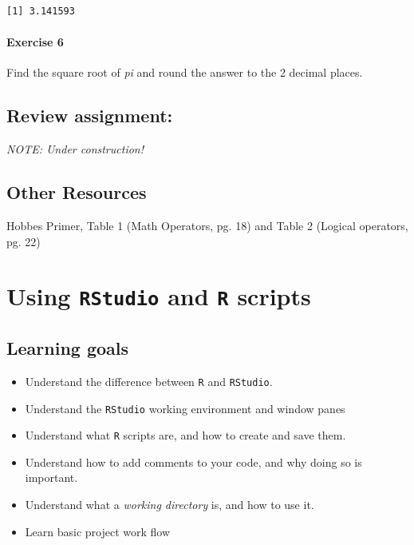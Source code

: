 \documentclass[
]{book}
\providecommand{\tightlist}{%
  \setlength{\itemsep}{0pt}\setlength{\parskip}{0pt}}
\begin{document}
\begin{verbatim}
[1] 3.141593
\end{verbatim}

\hypertarget{exercise-6}{%
\subsubsection*{Exercise 6}\label{exercise-6}}

Find the square root of \emph{pi} and round the answer to the 2 decimal places.

\hypertarget{review-assignment}{%
\section*{Review assignment:}\label{review-assignment}}

\emph{NOTE: Under construction!}

\hypertarget{other-resources}{%
\section{Other Resources}\label{other-resources}}

Hobbes Primer, Table 1 (Math Operators, pg. 18) and Table 2 (Logical operators, pg. 22)

\hypertarget{using-rstudio-and-r-scripts}{%
\chapter{\texorpdfstring{Using \texttt{RStudio} and \texttt{R} scripts}{Using RStudio and R scripts}}\label{using-rstudio-and-r-scripts}}

\hypertarget{learning-goals-1}{%
\section*{Learning goals}\label{learning-goals-1}}

\begin{itemize}
\tightlist
\item
  Understand the difference between \texttt{R} and \texttt{RStudio}.
\item
  Understand the \texttt{RStudio} working environment and window panes\\
\item
  Understand what \texttt{R} scripts are, and how to create and save them.
\item
  Understand how to add comments to your code, and why doing so is important.
\item
  Understand what a \emph{working directory} is, and how to use it.
\item
  Learn basic project work flow
\end{itemize}
\end{document}
